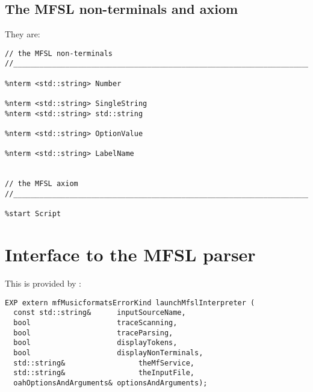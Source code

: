 \subsection{The MFSL non-terminals and axiom}

They are:
\begin{lstlisting}[language=Bison]
// the MFSL non-terminals
//_______________________________________________________________________________

%nterm <std::string> Number

%nterm <std::string> SingleString
%nterm <std::string> std::string

%nterm <std::string> OptionValue

%nterm <std::string> LabelName


// the MFSL axiom
//_______________________________________________________________________________

%start Script
\end{lstlisting}


\section{Interface to the MFSL parser}

This is provided by :
\begin{lstlisting}[language=Terminal]
EXP extern mfMusicformatsErrorKind launchMfslInterpreter (
  const std::string&      inputSourceName,
  bool                    traceScanning,
  bool                    traceParsing,
  bool                    displayTokens,
  bool                    displayNonTerminals,
  std::string&                 theMfService,
  std::string&                 theInputFile,
  oahOptionsAndArguments& optionsAndArguments);
\end{lstlisting}

